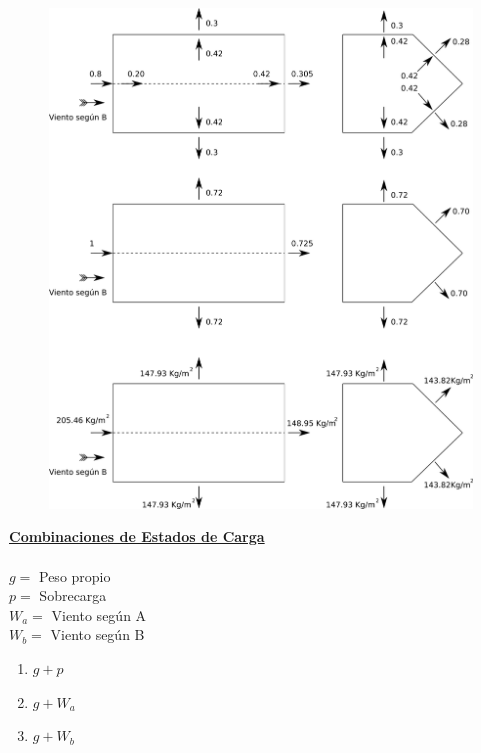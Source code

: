 \begin{enumerate}
\newpage
\begin{figure}[H]
\begin{center}
     \includegraphics[scale = 0.8]{chapters/chapter_2/images/cerrada_B.png}
\end{center}
\end{figure}

\newpage
\textbf{\underline{Combinaciones de Estados de Carga}} \\
\\
$g =$ Peso propio\\
$p =$ Sobrecarga\\
$W_a =$ Viento según A\\
$W_b =$ Viento según B\\
\begin{enumerate}
    \item $g+p$
    \item $g+W_a$
    \item $g+W_b$
\end{enumerate}

\end{enumerate}